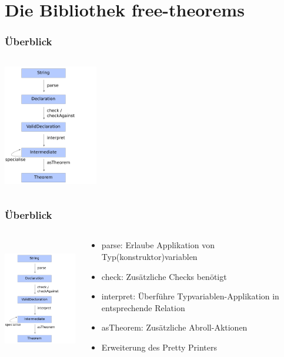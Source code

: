 \documentclass{beamer}
\begin{document}
\section{Die Bibliothek free-theorems}

\begin{frame}
\frametitle{Überblick}
\begin{columns}
\begin{column}{0.4\textwidth}
    \begin{center}
	\includegraphics[height=200px]{overview-free-theorems}
     \end{center}
\end{column}
\begin{column}{0.6\textwidth}
\end{column}
\end{columns}
\end{frame}

\begin{frame}
\frametitle{Überblick}
\begin{columns}
\begin{column}{0.4\textwidth}
    \begin{center}
	\includegraphics[height=200px]{overview-free-theorems}
     \end{center}
\end{column}
\begin{column}{0.6\textwidth}
  \begin{itemize}[<+->]
    \item parse: Erlaube Applikation von Typ(konstruktor)variablen
    \item check: Zusätzliche Checks benötigt
    \item interpret: Überführe Typvariablen-Applikation in entsprechende Relation
    \item asTheorem: Zusätzliche Abroll-Aktionen
    \item Erweiterung des Pretty Printers
  \end{itemize}
\end{column}
\end{columns}
\end{frame}
\end{document}
